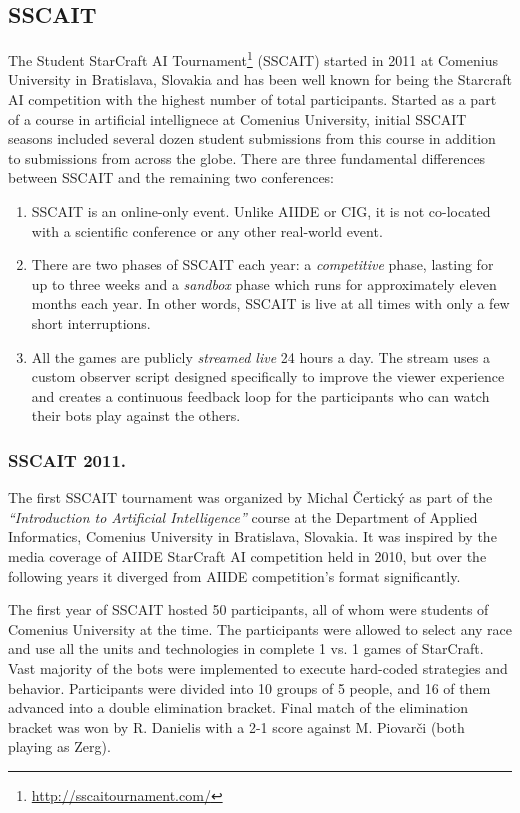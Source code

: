 \documentclass{llncs}
\begin{document}
\subsection*{SSCAIT}\label{sec:SSCAIT}
The Student StarCraft AI Tournament\footnote{\url{http://sscaitournament.com/}} (SSCAIT) started in 2011 at Comenius University in Bratislava, Slovakia and has been well known for being the Starcraft AI competition with the highest number of total participants. Started as a part of a course in artificial intellignece at Comenius University, initial SSCAIT seasons included several dozen student submissions from this course in addition to submissions from across the globe. 
There are three fundamental differences between SSCAIT and the remaining two conferences:
\begin{enumerate}
  \item SSCAIT is an online-only event. Unlike AIIDE or CIG, it is not co-located with a scientific conference or any other real-world event.
  \item There are two phases of SSCAIT each year: a {\em competitive} phase, lasting for up to three weeks and a {\em sandbox} phase which runs for approximately eleven months each year. In other words, SSCAIT is live at all times with only a few short interruptions.
  \item All the games are publicly {\em streamed live} 24 hours a day. The stream uses a custom observer script \cite{mattsson2015automatic} designed specifically to improve the viewer experience and creates a continuous feedback loop for the participants who can watch their bots play against the others.
\end{enumerate}

\subsubsection*{SSCAIT 2011.}
The first SSCAIT tournament was organized by Michal \v{C}ertick\'{y} as part of the {\em ``Introduction to Artificial Intelligence''} course at the Department of Applied Informatics, Comenius University in Bratislava, Slovakia. It was inspired by the media coverage of AIIDE StarCraft AI competition held in 2010, but over the following years it diverged from AIIDE competition's format significantly.

The first year of SSCAIT hosted 50 participants, all of whom were students of Comenius University at the time. The participants were allowed to select any race and use all the units and technologies in complete 1 vs. 1 games of StarCraft. Vast majority of the bots were implemented to execute hard-coded strategies and behavior. Participants were divided into 10 groups of 5 people, and 16 of them advanced into a double elimination bracket. Final match of the elimination bracket was won by R. Danielis with a 2-1 score against M. Piovar\v{c}i (both playing as Zerg).
\end{document}
